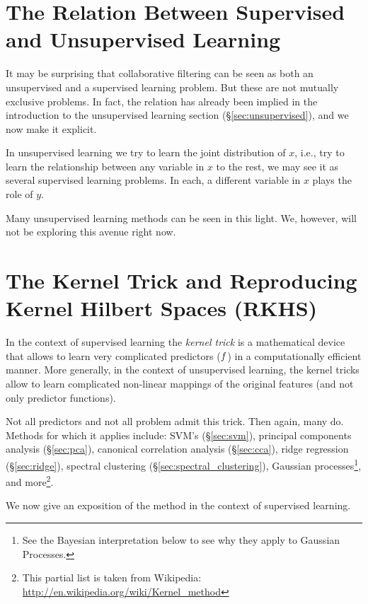 \chapter{The Relation Between Supervised and Unsupervised Learning}
\label{sec:relation_supervised_unsupervised}


It may be surprising that collaborative filtering can be seen as both an unsupervised and a supervised learning problem.
But these are not mutually exclusive problems. 
In fact, the relation has already been implied in the introduction to the unsupervised learning section (\S\ref{sec:unsupervised}), and we now make it explicit.

In unsupervised learning we try to learn the joint distribution of $x$, i.e., try to learn the relationship between any variable in $x$ to the rest, we may see it as several supervised learning problems. In each, a different variable in $x$ plays the role of $y$. 

Many unsupervised learning methods can be seen in this light. We, however, will not be exploring this avenue right now.



\chapter{The Kernel Trick and Reproducing Kernel Hilbert Spaces (RKHS)}
\label{apx:rkhs}

In the context of supervised learning the \emph{kernel trick} is a mathematical device that allows to learn very complicated predictors ($f$) in a computationally efficient manner. 
More generally, in the context of unsupervised learning, the kernel tricks allow to learn complicated non-linear mappings of the original features (and not only predictor functions). 

Not all predictors and not all problem admit this trick. Then again, many do. 
Methods for which it applies include:
SVM's (\S\ref{sec:svm}), principal components analysis (\S\ref{sec:pca}), canonical correlation analysis (\S\ref{sec:cca}), ridge regression (\S\ref{sec:ridge}), spectral clustering (\S\ref{sec:spectral_clustering}), Gaussian processes\footnote{See the Bayesian interpretation below to see why they apply to Gaussian Processes.}, and more\footnote{This partial list is taken from Wikipedia: \url{http://en.wikipedia.org/wiki/Kernel_method}}.

We now give an exposition of the method in the context of supervised learning. 


